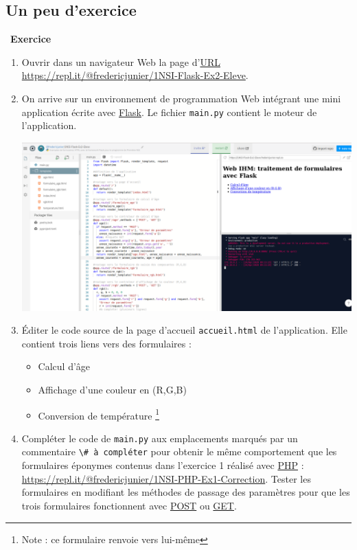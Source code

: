 \documentclass[
  11pt,
]{article}
\newcommand{\passthrough}[1]{#1}
\providecommand{\tightlist}{%
  \setlength{\itemsep}{0pt}\setlength{\parskip}{0pt}}
\newcounter{exo}
\newenvironment{exercice}[1]
{\par \medskip   \addtocounter{exo}{1} \noindent  
\begin{bclogo}[arrondi =0.1,   noborder = true, logo=\bccrayon, marge=4]{~\textbf{Exercice} \textbf{\theexo} {\itshape #1} }  \par}
{
\end{bclogo}
 \par \bigskip }
\newcounter{def}
\newcounter{prog}
\begin{document}
\hypertarget{un-peu-dexercice}{%
\subsection{Un peu d'exercice}\label{un-peu-dexercice}}

\begin{exercice}{}

\begin{enumerate}
\def\labelenumi{\arabic{enumi}.}
\item
  Ouvrir dans un navigateur Web la page
  d'\href{https://developer.mozilla.org/fr/docs/Glossaire/URL}{URL}
  \url{https://repl.it/@fredericjunier/1NSI-Flask-Ex2-Eleve}.
\item
  On arrive sur un environnement de programmation Web intégrant une mini
  application écrite avec
  \href{https://flask.palletsprojects.com/en/1.1.x/}{Flask}. Le fichier
  \passthrough{\lstinline!main.py!} contient le moteur de l'application.

  \includegraphics{images/flask-exemple2.png}\\
\item
  Éditer le code source de la page d'accueil
  \passthrough{\lstinline!accueil.html!} de l'application. Elle contient
  trois liens vers des formulaires :

  \begin{itemize}
  \tightlist
  \item
    Calcul d'âge\\
  \item
    Affichage d'une couleur en (R,G,B)
  \item
    Conversion de température \footnote{Note : ce formulaire renvoie
      vers lui-même}
  \end{itemize}
\item
  Compléter le code de \passthrough{\lstinline!main.py!} aux
  emplacements marqués par un commentaire
  \passthrough{\lstinline!\# à compléter!} pour obtenir le même
  comportement que les formulaires éponymes contenus dans l'exercice 1
  réalisé avec
  \href{https://developer.mozilla.org/fr/docs/Glossaire/PHP}{PHP} :
  \url{https://repl.it/@fredericjunier/1NSI-PHP-Ex1-Correction}. Tester
  les formulaires en modifiant les méthodes de passage des paramètres
  pour que les trois formulaires fonctionnent avec
  \href{https://developer.mozilla.org/fr/docs/Web/HTTP/M\%C3\%A9thode/POST}{POST}
  ou
  \href{https://developer.mozilla.org/fr/docs/Web/HTTP/M\%C3\%A9thode/GET}{GET}.
\end{enumerate}

\end{exercice}
\end{document}
